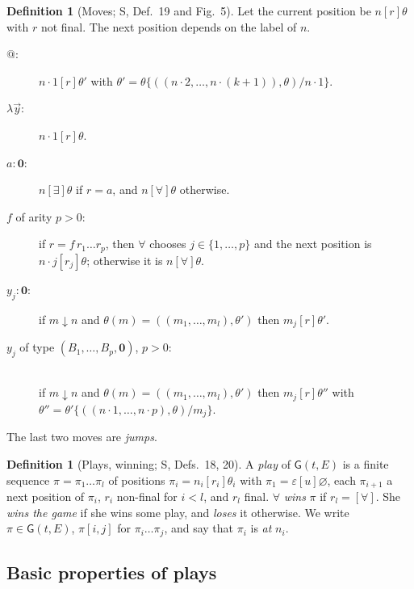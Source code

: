 \documentclass[11pt]{article}
\newcommand{\Ground}{\mathbf{0}}
\newcommand{\Gm}{\mathsf{G}}
\newcommand{\bnd}{\mathrel{\downarrow}}
\newcommand{\suc}[2]{#1{\cdot}#2}
\newcommand{\iv}[2]{\pi[#1,#2]}
\theoremstyle{plain}
\theoremstyle{definition}
\newtheorem{definition}[theorem]{Definition}
\theoremstyle{remark}
\begin{document}
\begin{definition}[Moves; S, Def.~19 and Fig.~5]\label{def:moves}
Let the current position be $n[r]\theta$ with $r$ not final.  The next
position depends on the label of $n$.
\begin{description}
\item[$@$:] $\suc n1[r]\theta'$ with
  $\theta'=\theta\{((\suc n2,\dots,\suc n{(k+1)}),\theta)/\suc n1\}$.
\item[$\lambda\vec y$:] $\suc n1[r]\theta$.
\item[$a:\Ground$:] $n[\exists]\theta$ if $r=a$, and $n[\forall]\theta$
  otherwise.
\item[$f$ of arity $p>0$:] if $r=f\,r_1\dots r_p$, then
  $\forall$ chooses $j\in\{1,\dots,p\}$ and the next position is
  $\suc nj[r_j]\theta$; otherwise it is $n[\forall]\theta$.
\item[$y_j:\Ground$:] if $m\bnd n$ and $\theta(m)=((m_1,\dots,m_l),\theta')$
  then $m_j[r]\theta'$.
\item[$y_j$ of type $(B_1,\dots,B_p,\Ground)$, $p>0$:]\ \\ if $m\bnd n$ and
  $\theta(m)=((m_1,\dots,m_l),\theta')$ then $m_j[r]\theta''$ with
  $\theta''=\theta'\{((\suc n1,\dots,\suc np),\theta)/m_j\}$.
\end{description}
The last two moves are \emph{jumps}.
\end{definition}

\begin{definition}[Plays, winning; S, Defs.~18, 20]
A \emph{play} of $\Gm(t,E)$ is a finite sequence
$\pi=\pi_1\dots\pi_l$ of positions $\pi_i=n_i[r_i]\theta_i$ with
$\pi_1=\varepsilon[u]\varnothing$, each $\pi_{i+1}$ a next position of
$\pi_i$, $r_i$ non-final for $i<l$, and $r_l$ final.  $\forall$
\emph{wins} $\pi$ if $r_l=[\forall]$.  She \emph{wins the game} if she
wins some play, and \emph{loses} it otherwise.  We write
$\pi\in\Gm(t,E)$, $\iv ij$ for $\pi_i\dots\pi_j$, and say that $\pi_i$ is
\emph{at} $n_i$.
\end{definition}

\subsection{Basic properties of plays}
\end{document}

